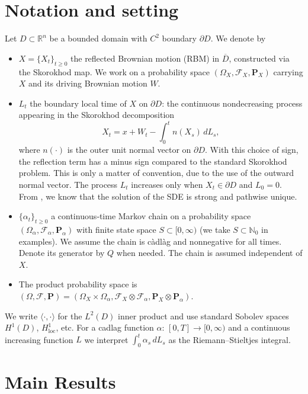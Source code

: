 \documentclass[11pt]{amsart}
\theoremstyle{plain}
\theoremstyle{definition}
\theoremstyle{remark}
\begin{document}
	\section*{Notation and setting}
	Let $D\subset\mathbb{R}^n$ be a bounded domain with $C^{2}$ boundary $\partial D$. We denote by
	\begin{itemize}
		\item $X = \{X_t\}_{t\ge0}$ the reflected Brownian motion (RBM) in $\overline D$, constructed via the Skorokhod map. We work on a probability space $(\Omega_X,\mathcal{F}_X,\mathbf P_X)$ carrying $X$ and its driving Brownian motion $W$.
		\item $L_t$ the boundary local time of $X$ on $\partial D$: the continuous nondecreasing process appearing in the Skorokhod decomposition
		\[ X_t = x + W_t - \int_0^t n(X_s)\,dL_s, \]
		where $n(\cdot)$ is the outer unit normal vector on $\partial D$. With this choice of sign, the reflection term has a minus sign compared to the standard Skorokhod problem. This is only a matter of convention, due to the use of the outward normal vector. The process $L_t$ increases only when $X_t\in\partial D$ and $L_0=0$. From \cite{LionsSznitman1984}, we know that the solution of the SDE is strong and pathwise unique.
		\item $\{\alpha_t\}_{t\ge0}$ a continuous‑time Markov chain on a probability space $(\Omega_\alpha,\mathcal{F}_\alpha,\mathbf P_\alpha)$ with finite state space $S\subset[0,\infty)$ (we take $S\subset\mathbb{N}_0$ in examples). We assume the chain is c\`adl\`ag and nonnegative for all times. Denote its generator by $Q$ when needed. The chain is assumed independent of $X$.
		\item The product probability space is $(\Omega,\mathcal F,\mathbf P)=(\Omega_X\times\Omega_\alpha,\mathcal{F}_X\otimes\mathcal{F}_\alpha,\mathbf P_X\otimes\mathbf P_\alpha)$.
	\end{itemize}
	
	We write $\langle\cdot,\cdot\rangle$ for the $L^2(D)$ inner product and use standard Sobolev spaces $H^1(D)$, $H^1_\mathrm{loc}$, etc. For a cadlag function $\alpha:\,[0,T]\to[0,\infty)$ and a continuous increasing function $L$ we interpret $\int_0^t\alpha_s\,dL_s$ as the Riemann–Stieltjes integral. %
	
	
	\section{Main Results}
	
\end{document}
